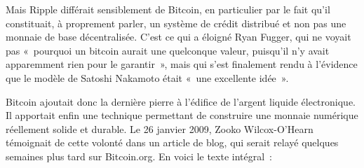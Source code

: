 Mais Ripple différait sensiblement de Bitcoin, en particulier par le fait qu'il constituait, à proprement parler, un système de crédit distribué et non pas une monnaie de base décentralisée. C'est ce qui a éloigné Ryan Fugger, qui ne voyait pas «~pourquoi un bitcoin aurait une quelconque valeur, puisqu'il n'y avait apparemment rien pour le garantir~», mais qui s'est finalement rendu à l'évidence que le modèle de Satoshi Nakamoto était «~une excellente idée~».

Bitcoin ajoutait donc la dernière pierre à l'édifice de l'argent liquide électronique. Il apportait enfin une technique permettant de construire une monnaie numérique réellement solide et durable. Le 26 janvier 2009, Zooko Wilcox-O'Hearn témoignait de cette volonté dans un article de blog, qui serait relayé quelques semaines plus tard sur Bitcoin.org. En voici le texte intégral~:

